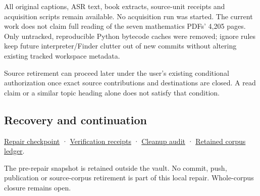 All original captions, ASR text, book extracts, source-unit receipts and acquisition scripts remain available. No acquisition run was started. The current work does not claim full reading of the seven mathematics PDFs' 4,205 pages. Only untracked, reproducible Python bytecode caches were removed; ignore rules keep future interpreter/Finder clutter out of new commits without altering existing tracked workspace metadata.

Source retirement can proceed later under the user's existing conditional authorization once exact source contributions and destinations are closed. A read claim or a similar topic heading alone does not satisfy that condition.

\subsection{Recovery and continuation}\label{appendix-faa2b5a8e820-recovery-and-continuation}

\hyperref[source-file-32c533c9c3158d19a7f75af7]{Repair checkpoint} · \hyperref[source-file-6fa8aab1ca5c06640ee139ec]{Verification receipts} · \hyperref[source-file-a7aedb60253f577f884f96f5]{Cleanup audit} · \hyperref[source-file-77f5d6d48d2587f7e7779921]{Retained corpus ledger}.

The pre-repair snapshot is retained outside the vault. No commit, push, publication or source-corpus retirement is part of this local repair. Whole-corpus closure remains open.
